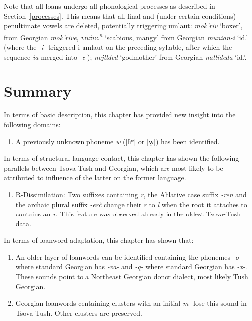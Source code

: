 Note that all loans undergo all phonological processes as described in Section~\ref{processes}. This means that all final and (under certain conditions) penultimate vowels are deleted, potentially triggering umlaut: \textit{mok'riv} `boxer', from Georgian \textit{mok'rive}, \textit{muine\textsuperscript{n}} `scabious, mangy' from Georgian \textit{munian-i} `id.' (where the \textit{-i-} triggered i-umlaut on the preceding syllable, after which the sequence \textit{ia} merged into \textit{-e-}); \textit{nejtlded} `godmother' from Georgian \textit{natlideda} `id.'.

\section{Summary}

In terms of basic description, this chapter has provided new insight into the following domains:

\begin{enumerate}
	\item A previously unknown phoneme \textit{w} ([ɦʷ] or [w̤]) has been identified.
\end{enumerate}


In terms of structural language contact, this chapter has shown the following parallels between Tsova-Tush and Georgian, which are most likely to be attributed to influence of the latter on the former language. 

\begin{enumerate}
	\item R-Dissimilation: Two suffixes containing \textit{r}, the Ablative case suffix \textit{-ren} and the archaic plural suffix \textit{-erč} change their \textit{r} to \textit{l} when the root it attaches to contains an \textit{r}. This feature was observed already in the oldest Tsova-Tush data.
	
\end{enumerate}

In terms of loanword adaptation, this chapter has shown that: 

\begin{enumerate}
	\item An older layer of loanwords can be identified containing the phonemes \textit{-o-} where standard Georgian has \textit{-va-} and \textit{-q-} where standard Georgian has \textit{-x-}. These sounds point to a Northeast Georgian donor dialect, most likely Tush Georgian.
	\item Georgian loanwords containing clusters with an initial \textit{m-} lose this sound in Tsova-Tush. Other clusters are preserved.
	
\end{enumerate}

